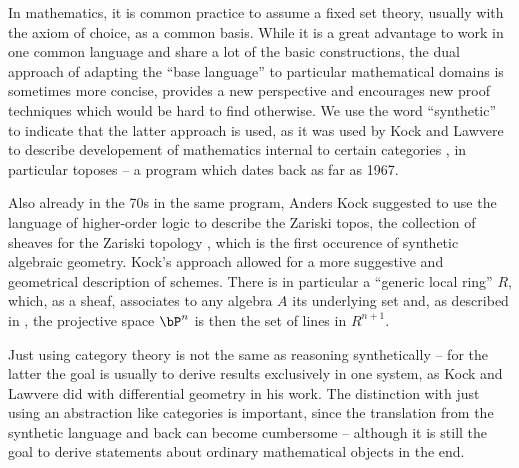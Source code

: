
In mathematics, it is common practice to assume a fixed set theory, usually with the axiom of choice, as a common basis. While it is a great advantage to work in one common language and share a lot of the basic constructions, the dual approach of adapting the  ``base language'' to particular mathematical domains is sometimes more concise, provides a new perspective and encourages new proof techniques which would be hard to find otherwise.
We use the word ``synthetic'' to indicate that the latter approach is used,
as it was used by Kock and Lawvere to describe developement of mathematics internal to certain categories \cite{lawvere-categorical-dynamics}, in particular toposes -- a program which dates back as far as 1967.

Also already in the 70s in the same program, Anders Kock suggested to use the language of higher-order logic \cite{Church40} to describe the Zariski topos, the collection of sheaves for the Zariski topology \cite{Kock74,kockreyes}, which is the first occurence of synthetic algebraic geometry.
Kock's approach allowed for a more suggestive and geometrical description of schemes.
There is in particular a ``generic local ring'' $R$, which, as a sheaf, associates to any algebra $A$ its underlying set and, as described in \cite{kockreyes}, the projective space $\bP^n$ is then the set of lines in $R^{n+1}$.


Just using category theory is not the same as reasoning synthetically -- for the latter the goal is usually to derive results exclusively in one system,
as Kock and Lawvere did with differential geometry in his work.
The distinction with just using an abstraction like categories is important, since the translation from the synthetic language and back can become cumbersome -- although it is still the goal to derive statements about ordinary mathematical objects in the end.

